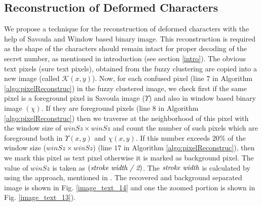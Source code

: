 \documentclass[runningheads]{llncs}
\begin{document}
\subsection {Reconstruction of Deformed Characters} \label{reconstruction}
We propose a technique for the reconstruction of deformed characters with the help of Savoula and Window based binary image. This reconstruction is required as the shape of the characters should remain intact for proper decoding of the secret number, as mentioned in introduction (see section \ref{intro}). The obvious text pixels (sure text pixels), obtained from the fuzzy clustering are copied into a new image (called $\mathcal{K}(x,y)$). Now, for each confused pixel (line $7$ in Algorithm \ref{algo:pixelReconstruc}) in the fuzzy clustered image, we check first if the same pixel is a foreground pixel in Savoula image ($\Upsilon$) and  also in window based binary image $(\chi)$. If they are foreground pixels (line 8 in Algorithm \ref{algo:pixelReconstruc}) then we traverse at the neighborhood of this pixel with the window size of $winSz \times winSz$ and count the number of such pixels which are foreground both in $\Upsilon(x, y)$ and $\chi(x, y)$.
If this number exceeds $20\%$ of the window size ($winSz \times winSz$) (line $17$ in Algorithm \ref{algo:pixelReconstruc}), then we mark this pixel as text pixel otherwise it is marked as background pixel. The value of $winSz$ is taken as $(\emph{\text{stroke width} / 2})$. The $\emph{\text{stroke width}}$ is calculated by using the approach, mentioned in \cite{BolanSu2013}.  
The recovered and background separated image is shown in Fig. \ref{image_text_14} and one the zoomed portion is shown in Fig. \ref{image_text_13}). 
\end{document}
